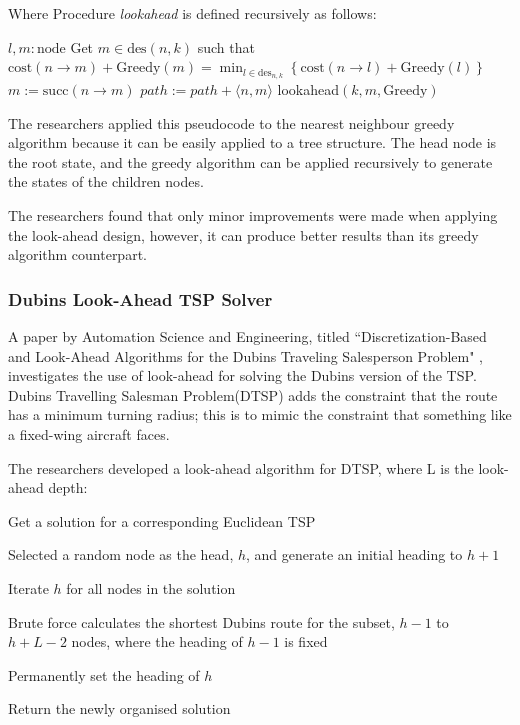 \noindent Where Procedure \textit{lookahead} is defined recursively as follows:

\bigskip

\begin{algorithm}[H]
\caption{lookahead$(k : \text{integer}, n : \text{node}, \text{Greedy} : \text{greedy algorithm})$}
\begin{algorithmic}[1]
\State $l, m : \text{node}$
    \Return
\Else
    \State Get $m \in \text{des}(n, k)$ such that
    \State \(
    \text{cost}(n \rightarrow m) + \text{Greedy}(m) = \min_{l \in \text{des}_{n, k}} \left\{ \text{cost}(n \rightarrow l) + \text{Greedy}(l) \right\}
    \)
    \State $m := \text{succ}(n \rightarrow m)$
    \State $path := path + \langle n, m \rangle$ 
    \State lookahead$(k, m, \text{Greedy})$
\EndIf
\end{algorithmic}
\cite{SARKAR19941}
\end{algorithm}

The researchers applied this pseudocode to the nearest neighbour greedy algorithm because it can be easily applied to a tree structure. The head node is the root state, and the greedy algorithm can be applied recursively to generate the states of the children nodes.

The researchers found that only minor improvements were made when applying the look-ahead design, however, it can produce better results than its greedy algorithm counterpart\cite{SARKAR19941}.

\subsubsection{Dubins Look-Ahead TSP Solver}

A paper by Automation Science and Engineering, titled ``Discretization-Based and Look-Ahead Algorithms for the Dubins Traveling Salesperson Problem" \cite{Cohen2017}, investigates the use of look-ahead for solving the Dubins version of the TSP. Dubins Travelling Salesman Problem(DTSP) adds the constraint that the route has a minimum turning radius\cite{Dubins-tsp}; this is to mimic the constraint that something like a fixed-wing aircraft faces.

The researchers developed a look-ahead algorithm for DTSP, where L is the look-ahead depth\cite{Cohen2017}:

\begin{legal}
  \item Get a solution for a corresponding Euclidean TSP
  \item Selected a random node as the head, $h$, and generate an initial heading to $h+1$ 
  \item Iterate $h$ for all nodes in the solution
  \begin{legal}
    \item Brute force calculates the shortest Dubins route for the subset, $h-1$ to $h+L-2$ nodes, where the heading of $h-1$ is fixed
    \item Permanently set the heading of $h$
  \end{legal}
  \item Return the newly organised solution
\end{legal}

